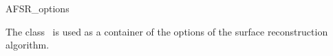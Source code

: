 \begin{ccRefClass}{AFSR_options}

\ccDefinition
  
The class \ccRefName\ is used as a container of the options of the surface reconstruction algorithm.





\end{ccRefClass}
